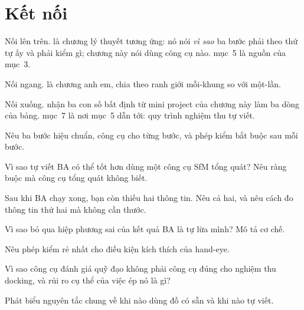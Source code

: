 \documentclass[../../marker.tex]{subfiles}
\begin{document}
\section{Kết nối}

Nối lên trên.  là chương lý thuyết tương ứng: nó nói \emph{vì sao} ba bước phải theo thứ tự ấy và phải kiểm gì; chương này nói dùng công cụ nào.  mục~5 là nguồn của mục~3.

Nối ngang.  là chương anh em, chia theo ranh giới mỗi-khung so với một-lần.

Nối xuống.  nhận ba con số bất định từ mini project của chương này làm ba dòng của bảng.  mục~7 là nơi mục~5 dẫn tới: quy trình nghiệm thu tự viết.

\begin{tukiem}
\item Nêu ba bước hiệu chuẩn, công cụ cho từng bước, và phép kiểm bắt buộc sau mỗi bước.
\item Vì sao tự viết BA có thể tốt hơn dùng một công cụ SfM tổng quát? Nêu ràng buộc mà công cụ tổng quát không biết.
\item Sau khi BA chạy xong, bạn còn thiếu hai thông tin. Nêu cả hai, và nêu cách đo thông tin thứ hai mà không cần thước.
\item Vì sao bỏ qua hiệp phương sai của kết quả BA là tự lừa mình? Mô tả cơ chế.
\item Nêu phép kiểm rẻ nhất cho điều kiện kích thích của hand-eye.
\item Vì sao công cụ đánh giá quỹ đạo không phải công cụ đúng cho nghiệm thu docking, và rủi ro cụ thể của việc ép nó là gì?
\item Phát biểu nguyên tắc chung về khi nào dùng đồ có sẵn và khi nào tự viết.
\end{tukiem}
\ifSubfilesClassLoaded{\printbibliography[title={Nguồn}]}{}
\end{document}
